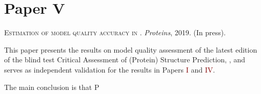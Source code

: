 \section*{Paper \textcolor[cmyk]{0, 0.87, 0.68, 0.32}{V}}
\begin{center}
	\textsc{Estimation of model quality accuracy in .}
	\emph{Proteins}, 2019. (In press).
\end{center}

\noindent
This paper presents the results on model quality assessment of the latest edition of the blind test Critical Assessment of (Protein) Structure Prediction, ,
and serves as independent validation for the results in Papers \textcolor{Maroon}{I} and \textcolor{Maroon}{IV}.

The main conclusion is that P
